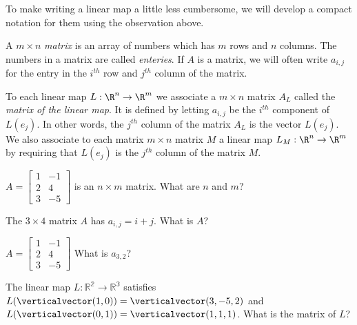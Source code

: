 	To make writing a linear map a little less cumbersome, we will develop a compact notation for them using the observation above. 
	
	\begin{definition}
		A $m \times n$ \textit{matrix} is an array of numbers which has $m$ rows and $n$ columns.  The numbers in a matrix are called \textit{enteries}. If $A$ is a matrix, 
		we will often write $a_{i,j}$ for the entry in the $i^{th}$  row and $j^{th}$ column of the matrix.
	\end{definition}
	
	\begin{definition}
		To each linear map $L: \R^n \to \R^m$  we associate a $m \times n$ matrix $A_L$ called the \textit{matrix of the linear map}.  It is defined 
		by letting $a_{i,j}$ be the $i^{th}$ component of $L(e_j)$.  In other words, the $j^{th}$ column of the matrix $A_L$ is the vector $L(e_j)$.  We also associate to each 
		matrix $m \times n$ matrix $M$ a linear map $L_M: \R^n \to \R^m$ by requiring that $L(e_j)$ is the $j^{th}$ column of the matrix $M$. 
	\end{definition}
	
	\begin{question}
		$A = \begin{bmatrix}
		1&-1\\2&4\\3&-5
		\end{bmatrix}$
		is an $n \times m$ matrix.  What are $n$ and $m$? 
	\end{question}
	
	\begin{question}
		The $3 \times 4$ matrix $A$ has $a_{i,j} = i+j$.  What is $A$?
	\end{question}
	
	\begin{question}
		$A = \begin{bmatrix}
		1&-1\\2&4\\3&-5
		\end{bmatrix}$
		 What is $a_{3,2}$?
	\end{question}
	
	\begin{question}
		The linear map $L:\mathbb{R^2}\to\mathbb{R^3}$ satisfies $L(\verticalvector(1,0)) = \verticalvector(3,-5,2)$ and $L(\verticalvector(0,1)) = \verticalvector(1,1,1)$. 
		 What is the matrix of $L$?
	\end{question}
	

